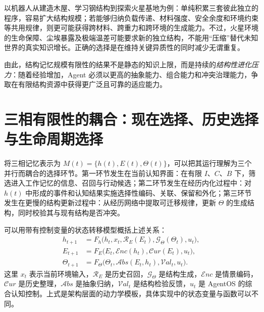 以机器人从建造木屋、学习钢结构到探索火星基地为例：单纯积累三套彼此独立的程序，容易扩大结构规模；若能够归纳负载传递、材料强度、安全余度和环境约束等共用规律，则更可能获得跨材料、跨重力和跨环境的生成能力。不过，火星环境的生命保障、尘埃暴露及极端温差可能要求新的独立结构，不能用“压缩”替代未知世界的真实知识增长。正确的选择是在维持关键异质性的同时减少无谓重复。

由此，结构记忆规模有限性的结果不是静态的知识上限，而是持续的\emph{结构性进化压力}：随着经验增加，Agent 必须以更高的抽象能力、组合能力和冲突治理能力，争取在有限结构资源中获得更广泛且可靠的适应能力。

\section{三相有限性的耦合：现在选择、历史选择与生命周期选择}
\label{sec:coupled-selection}

将三相记忆表示为 $M(t)=\{h(t),E(t),\Theta(t)\}$，可以把其运行理解为三个并行而耦合的选择环节。第一环节发生在当前认知界面：在有限 $I$、$C$、$B$ 下，筛选进入工作记忆的信息、召回与行动候选；第二环节发生在经历内化过程中：对 $h(t)$ 中形成的事件和认知结果实施选择性编码、关联、保留和外化；第三环节发生在更慢的结构更新过程中：从经历网络中提取可迁移规律，更新 $\Theta$ 的生成结构，同时校验其与现有结构是否冲突。

可以用带有控制变量的状态转移模型概括上述关系：
\begin{equation}
\label{eq:coupled-dynamics}
\begin{aligned}
 h_{t+1}&=F_h\bigl(h_t,x_t,\mathcal R_E(E_t),\mathcal G_{\Theta}(\Theta_t),u_t\bigr),\\
 E_{t+1}&=F_E\bigl(E_t,\mathcal Enc(h_t),\mathcal Cur(E_t),u_t\bigr),\\
 \Theta_{t+1}&=F_{\Theta}\bigl(\Theta_t,\mathcal Abs(E_t,h_t),\mathcal Val_t,u_t\bigr).
\end{aligned}
\end{equation}
这里 $x_t$ 表示当前环境输入，$\mathcal R_E$ 是历史召回，$\mathcal G_{\Theta}$ 是结构生成，$\mathcal Enc$ 是情景编码，$\mathcal Cur$ 是历史整理，$\mathcal Abs$ 是抽象归纳，$\mathcal Val_t$ 是结构检验反馈，$u_t$ 是 AgentOS 的综合认知控制。上式是架构层面的动力学模板，具体实现中的状态变量与函数可以不同。

